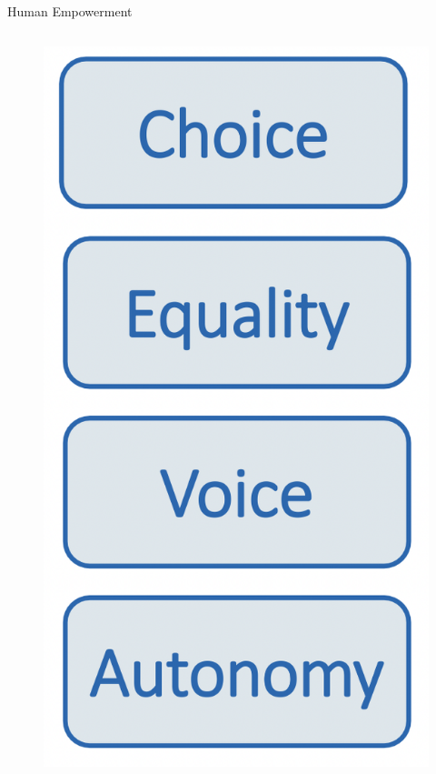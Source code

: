 \documentclass[11pt]{beamer}
\begin{document}
\begin{frame}{Human Empowerment \parencite[71]{Welzel2013}}
	\begin{columns}
		\begin{column}{0.3\textwidth}
			\begin{figure}[ht]
				\includegraphics[width=\textwidth]{pics/s9-2.png}
			\end{figure}

\end{column}
\end{columns}
\end{frame}
\end{document}
